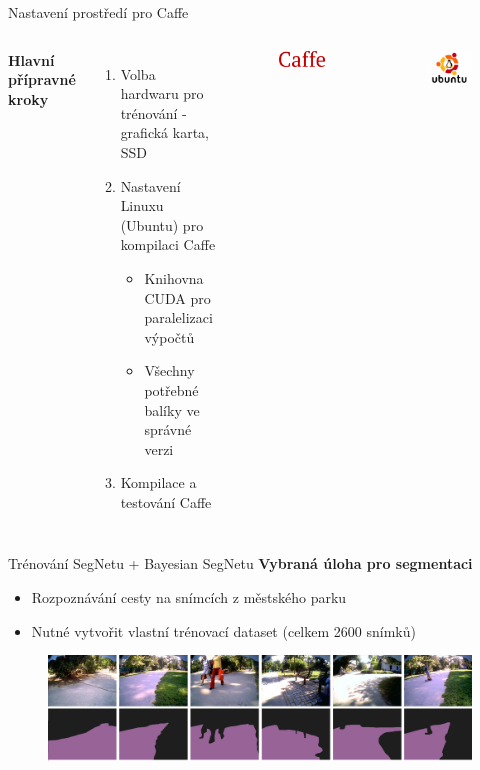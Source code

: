 \documentclass[aspectratio=1610]{beamer}
\begin{document}
\begin{frame}{Nastavení prostředí pro Caffe}
	\begin{columns}[T]
    { 		
		\textbf{Hlavní přípravné kroky}
		\begin{enumerate}
			\item Volba hardwaru pro trénování - grafická karta, SSD
			\item Nastavení Linuxu (Ubuntu) pro kompilaci Caffe
			\begin{itemize}
				\item Knihovna CUDA pro paralelizaci výpočtů
				\item Všechny potřebné balíky ve správné verzi
			\end{itemize}
			\item Kompilace a testování Caffe					
		\end{enumerate}
	}
	\begin{figure}[h]
	\centering
	\includegraphics[width=4cm, keepaspectratio]{caffe-logo.png}			
	\end{figure}
	\vspace{6mm}
	\begin{figure}[h]
	\centering
	\includegraphics[width=4cm, keepaspectratio]{ubuntu.jpg}			
	\end{figure}
	\end{columns}
\end{frame}
\begin{frame}{Trénování SegNetu + Bayesian SegNetu}
\textbf{Vybraná úloha pro segmentaci}
	\begin{itemize}
		\item Rozpoznávání cesty na snímcích z městského parku
		\item Nutné vytvořit vlastní trénovací dataset (celkem 2600 snímků)
	\end{itemize}
	\vspace{5mm}
	\begin{figure}[h]
	\centering
	\includegraphics[width=13cm, keepaspectratio]{result.png}			
	\end{figure}	
\end{frame}
\end{document}
